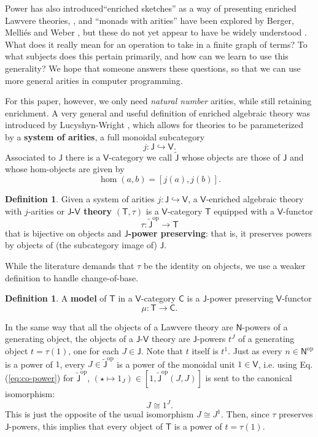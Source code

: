 \documentclass{amsart}
\theoremstyle{definition}
\newtheorem{definition}[theorem]{Definition}
\newcommand{\NN}{\mathsf{N}}
\newcommand{\V}{\mathsf{V}}
\newcommand{\C}{\mathsf{C}}
\newcommand{\J}{\mathsf{J}}
\newcommand{\T}{\mathsf{T}}
\newcommand{\op}{\mathrm{op}}
\newcommand{\maps}{\colon}
\begin{document}
Power has also introduced``enriched sketches'' as a way of presenting enriched Lawvere theories, \cite{powsketch}, and ``monads with arities'' have been explored by Berger, Melli\'es and Weber \cite{bergermelliesweber}, but these do not yet appear to have be  widely understood . What does it really mean for an operation to take in a finite graph of terms? To what subjects does this pertain primarily, and how can we learn to use this generality? We hope that someone answers these questions, so that we can use more general arities in computer programming.

For this paper, however, we only need \textit{natural number} arities, while still retaining enrichment. A very general and useful definition of enriched algebraic theory was introduced by Lucyshyn-Wright \cite{rbb}, which allows for theories to be parameterized by a \textbf{system of arities}, a full monoidal subcategory 
\[ j\maps \J \hookrightarrow \V. \]
Associated to $\J$ there is a $\V$-category we call $\tilde{\J}$ whose objects are
those of $\J$ and whose hom-objects are given by
\[         \hom(a,b) = [j(a), j(b)]   .\]

\begin{definition}
Given a system of arities $j \maps \J \hookrightarrow \V$, a $\V$-enriched algebraic theory with $j$-arities or \textbf{$\J$-$\V$ theory} $(\T,\tau)$ is a $\V$-category $\T$ equipped with a $\V$-functor 
\[ \tau\maps\tilde{\J}^\op \to \T \]
that is bijective on objects and \textbf{$\J$-power preserving}: that is, it preserves powers by objects of (the subcategory image of) $\J$. 
\end{definition}
\noindent
While the literature demands that $\tau$ be the identity on objects, we use a weaker definition to handle change-of-base.

\begin{definition}
A \textbf{model} of $\T$ in a $\V$-category $\C$ is a $\J$-power preserving $\V$-functor 
\[  \mu \maps \T \to \C.\]
\end{definition}

In the same way that all the objects of a Lawvere theory are $\NN$-powers of a generating object, the objects of a $\J$-$\V$ theory are $\J$-powers $t^J$ of a generating object $t = \tau(1)$, one for each $J \in \J$. Note that $t$ itself is $t^1$.  Just as every $n\in \NN^\op$ is a power of $1$, every $J\in \tilde{\J}^{\op}$ is a power of the monoidal unit $1\in \V$, i.e. using Eq. (\ref{eq:co-power}) for $\tilde{\J}^{\op}$, $(\star \mapsto 1_J) \in [1,\tilde{\J}^{\op}(J,J)]$ is sent to the canonical isomorphism:
\begin{equation}
J \cong 1^J.
\end{equation}
This is just the opposite of the usual isomorphism $J \cong J^1$. Then, since $\tau$ preserves $\J$-powers, this implies that every object of $\T$ is a power of $t = \tau(1)$.
\end{document}
